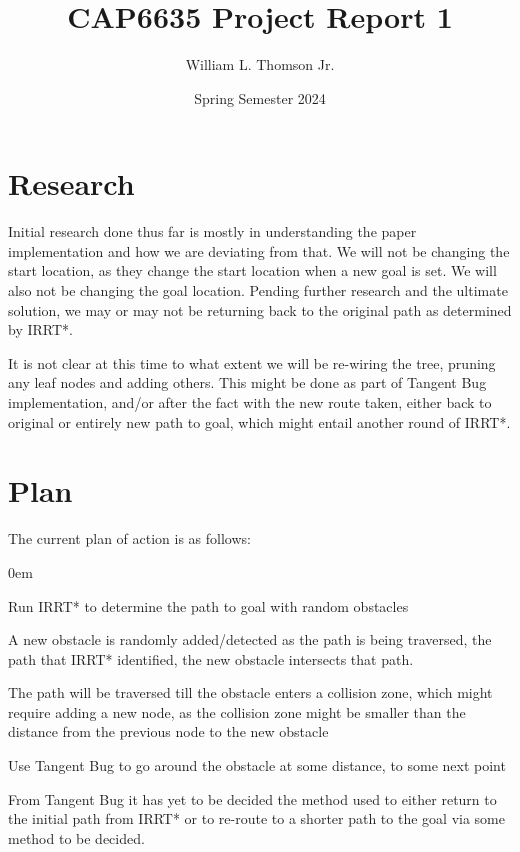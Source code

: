 \documentclass[12pt]{article}
\title{\textbf{CAP6635 Project Report 1}}
\author{William L. Thomson Jr.}
\date{Spring Semester 2024}
\begin{document}
\maketitle

\vspace{-2em}

\section{Research}
\indent \indent Initial research done thus far is mostly in understanding the paper implementation and
how we are deviating from that. We will not be changing the start location, as they change the start location when a new goal is set. We will also not be changing the goal location.
Pending further research and the ultimate solution, we may or may not be returning back
to the original path as determined by IRRT*.

It is not clear at this time to what extent we will be re-wiring the tree, pruning any leaf
nodes and adding others. This might be done as part of Tangent Bug implementation, and/or
after the fact with the new route taken, either back to original or entirely new path to 
goal, which might entail another round of IRRT*.

\section{Plan}
The current plan of action is as follows:
\begin{description}[style=multiline,leftmargin=8em]
\itemsep0em
\item[IRRT*] Run IRRT* to determine the path to goal with random obstacles
\item[New Obstacle] A new obstacle is randomly added/detected as the path is being traversed,
					the path that IRRT* identified, the new obstacle intersects that path.
\item[Collision Zone] The path will be traversed till the obstacle enters a collision zone,
                      which might require adding a new node, as the collision zone might
                      be smaller than the distance from the previous node to the new obstacle
\item[Tangent Bug] Use Tangent Bug to go around the obstacle at some distance, to some next point
\item[To Be Decided] From Tangent Bug it has yet to be decided the method used to either return
					 to the initial path from IRRT* or to re-route to a shorter path to the goal
					 via some method to be decided.
\end{description}
\end{document}
